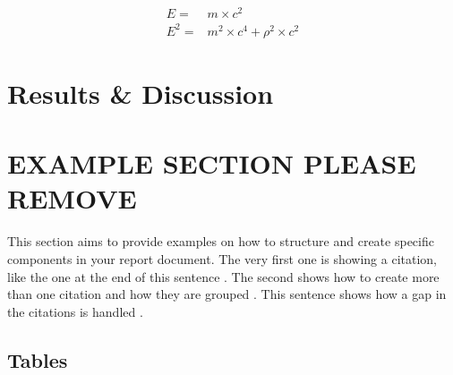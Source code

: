 \documentclass[12pt, letterpaper]{article}
\begin{document}
	\begin{align} %
		\label{eq:eg3} E = & m\times c^2\\
		\label{eq:eg4} E^2 = & m^2\times c^4 + \rho^2\times c^2
	\end{align}

	\section{Results \& Discussion}\hspace{2.6ex}
			\label{}
			\lipsum[45-57] %
	\newpage
	
	\section{EXAMPLE SECTION PLEASE REMOVE}
		This section aims to provide examples on how to structure and create specific components in your report document. The very first one is showing a citation, like the one at the end of this sentence \cite{TEST}. The second shows how to create more than one citation and how they are grouped \cite{testone,cite2,cite3,cite4,cite5}.
		This sentence shows how a gap in the citations is handled \cite{testone,cite2,cite3,cite5}. 
		\subsection{Tables}

\end{document}
